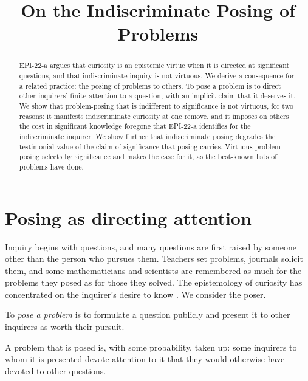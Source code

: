 \documentclass{situationist-preprint}
\title{On the Indiscriminate Posing of Problems}
\begin{document}
\maketitle

\begin{abstract}
EPI-22-a argues that curiosity is an epistemic virtue when it is directed at significant questions, and that indiscriminate inquiry is not virtuous. We derive a consequence for a related practice: the posing of problems to others. To pose a problem is to direct other inquirers' finite attention to a question, with an implicit claim that it deserves it. We show that problem-posing that is indifferent to significance is not virtuous, for two reasons: it manifests indiscriminate curiosity at one remove, and it imposes on others the cost in significant knowledge foregone that EPI-22-a identifies for the indiscriminate inquirer. We show further that indiscriminate posing degrades the testimonial value of the claim of significance that posing carries. Virtuous problem-posing selects by significance and makes the case for it, as the best-known lists of problems have done.
\end{abstract}

\section{Posing as directing attention}

Inquiry begins with questions, and many questions are first raised by someone other than the person who pursues them. Teachers set problems, journals solicit them, and some mathematicians and scientists are remembered as much for the problems they posed as for those they solved. The epistemology of curiosity has concentrated on the inquirer's desire to know \citep{Zagzebski1996,Whitcomb2010}. We consider the poser.

\begin{definition}\label{d:pose}
To \emph{pose a problem} is to formulate a question publicly and present it to other inquirers as worth their pursuit.
\end{definition}

\begin{assumption}[Uptake]\label{a:uptake}
A problem that is posed is, with some probability, taken up: some inquirers to whom it is presented devote attention to it that they would otherwise have devoted to other questions.
\end{assumption}
\end{document}
